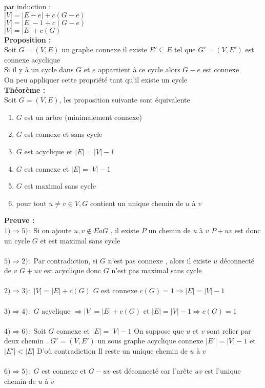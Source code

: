 \documentclass{report}
\newcommand{\preuve}{\textcolor[rgb]{0.95,0.25,0}{Preuve : }}
\newcommand{\Preuve}{\textbf{\preuve}}
\newcommand{\propo}{\textcolor[rgb]{0,0,0.75}{Proposition : }}
\newcommand{\Propo}{\textbf{\propo}}
\newcommand{\thm}{\textcolor[rgb]{0,0.4,1}{Théorème : }}
\newcommand{\THM}{\textbf{\thm}}
\begin{document}
par induction :\\
$\left|V\right|=\left|E-e\right|+c(G-e)$\\
$\left|V\right|=\left|E\right|-1+c(G-e)$\\
$\left|V\right|=\left|E\right|+c(G)$\\

\Propo\\
Soit $G=(V,E)$ un graphe connexe il existe $E'\subseteq E$  tel que $G'=(V,E')$ est connexe acyclique\\
Si il y à un cycle dans $G$ et $e$ appartient à ce cycle alors $G-e$ est connexe\\
On peu appliquer cette propriété tant qu'il existe un cycle\\
\newpage
\THM\\
Soit $G=(V,E)$, les proposition suivante sont équivalente\\
\begin{enumerate}
	\item $G$ est un arbre (minimalement connexe)
	\item $G$ est connexe et sans cycle
	\item $G$ est acyclique et $\left|E\right|=\left|V\right|-1$
	\item $G$ est connexe et $\left|E\right|=\left|V\right|-1$
	\item $G$ est maximal sans cycle
	\item pour tout $u\neq v \in V,G$ contient un unique chemin de $u$ à $v$\\
\end{enumerate}

\Preuve\\
\textbf{$1)\Rightarrow5) :$} Si on  ajoute $u,v \notin E a G$ , il existe $P$ un chemin de $u$ à $v$ $P+uv$ est donc un cycle $G$ et est maximal sans cycle\\
\\\textbf{$5)\Rightarrow2) :$} Par contradiction, si $G$ n'est pas connexe , alors il existe $u$ déconnecté de $v$ $G+uv$ est acyclique donc $G$ n'est pas maximal sans cycle\\
\\\textbf{$2)\Rightarrow3) :$} $\left|V\right|=\left|E\right|+c(G)$ $G$ est connexe $c(G)=1 \Longrightarrow \left|E\right|=\left|V\right|-1$\\
\\\textbf{$3)\Rightarrow4) :$} $G$ acyclique $\Rightarrow \left|V\right|=\left|E\right|+c(G)$ et $\left|E\right|=\left|V\right|-1 \Rightarrow c(G)=1$\\
\\\textbf{$4)\Rightarrow6) :$} Soit $G$ connexe et $\left|E\right|=\left|V\right|-1$ On suppose que $u$ et $v$ sont relier par deux chemin . $G'=(V,E')$ un sous graphe acyclique connexe $\left|E'\right|=\left|V\right|-1$ et $\left|E'\right|<\left|E\right|$ D'où contradiction Il reste un unique chemin de $u$ à $v$\\
\\\textbf{$6)\Rightarrow5) :$}	$G$ est connexe et $G-uv$ est déconnecté car l'arête $uv$ est l'unique chemin de $u$ à $v$\\
\end{document}
